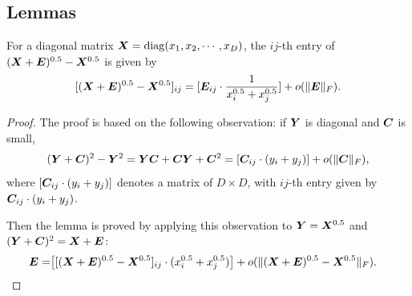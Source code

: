 \subsection{Lemmas}
\begin{lemma}\label{lemma:deri}
For a diagonal matrix $\boldsymbol{X}=\operatorname{diag}(x_1,x_2,\cdots, x_D)$,  the $ij$-th entry of
$(\boldsymbol{X}+\boldsymbol{E})^{0.5}-\boldsymbol{X}^{0.5}$ is given by
\[
[(\boldsymbol{X}+\boldsymbol{E})^{0.5}-\boldsymbol{X}^{0.5}]_{ij}= [\boldsymbol{E}_{ij}\cdot \frac{1}{x_i^{0.5}+x_j^{0.5}}]+
o(\|\boldsymbol{E}\|_F).
\]
\end{lemma}
\begin{proof}
The proof is based on the following observation: if $\boldsymbol{Y}$ is diagonal and $\boldsymbol{C}$
is small, 
\[
(\boldsymbol{Y}+\boldsymbol{C})^2-\boldsymbol{Y}^2=  \boldsymbol{Y}\boldsymbol{C}+\boldsymbol{C}\boldsymbol{Y} +\boldsymbol{C}^2 = [\boldsymbol{C}_{ij}\cdot (y_i+y_j)]
+o(\|\boldsymbol{C}\|_F),
\]
where $[\boldsymbol{C}_{ij}\cdot (y_i+y_j)]$ denotes a matrix of $D\times D$, with $ij$-th
entry given by $\boldsymbol{C}_{ij}\cdot (y_i+y_j)$.

Then the lemma is proved by applying this observation to $\boldsymbol{Y}=\boldsymbol{X}^{0.5}$ and
$(\boldsymbol{Y}+\boldsymbol{C})^2=\boldsymbol{X}+\boldsymbol{E}$:
\begin{align*}
\bE=&\big[[(\bX+\bE)^{0.5}-\bX^{0.5}]_{ij}\cdot
(x_i^{0.5}+x_j^{0.5})\big]+o(\|(\bX+\bE)^{0.5}-\bX^{0.5}\|_F).%
\end{align*}
\end{proof}

